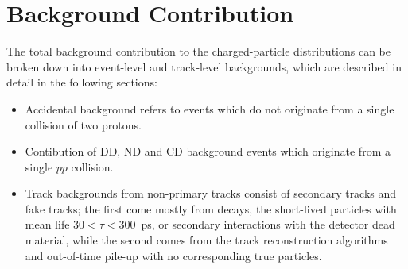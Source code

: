 \chapter{Background Contribution}\label{section:star_background}
The total background contribution to the charged-particle distributions can be broken down into
event-level and track-level backgrounds, which are described in detail in the following sections:
\begin{itemize}
	\item Accidental background refers to events which do not originate from a single collision of two protons.
	\item Contibution of \ac{DD}, \ac{ND} and \ac{CD} background events which originate from a single $pp$ collision.
	\item Track backgrounds from non-primary tracks consist of secondary tracks and fake tracks; the first come mostly from decays, the short-lived particles with mean life $30 < \tau < 300$~ps, or secondary interactions with the detector dead material, while the second comes from the track reconstruction algorithms and out-of-time pile-up with
	no corresponding true particles.
\end{itemize}


